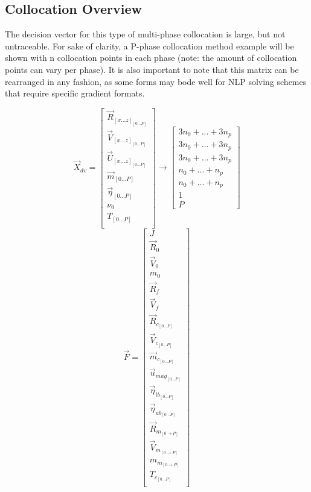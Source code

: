 \subsection{Collocation Overview}
The decision vector for this type of multi-phase collocation is large, but not untraceable. For sake of clarity, a P-phase collocation method example will be shown with n collocation points in each phase (note: the amount of collocation points can vary per phase). It is also important to note that this matrix can be rearranged in any fashion, as some forms may bode well for NLP solving schemes that require specific gradient formats.
\begin{multicols}{2}
\begin{equation}
\vec{X}_{dv} = 
\begin{bmatrix}
\vec{R}_{[x ... z]_{[0 ... P]}} \\
\vec{V}_{[x ... z]_{[0 ... P]}} \\
\vec{U}_{[x ... z]_{[0 ... P]}} \\
\vec{m}_{[0 ... P]} \\
\vec{\eta }_{[0 ... P]} \\
\nu_0 \\
T_{[0 ... P]} \\
\end{bmatrix}
\rightarrow
\begin{bmatrix}
3 n_0 + ... + 3 n_p \\
3 n_0 + ... + 3 n_p \\
3 n_0 + ... + 3 n_p \\
n_0 + ... + n_p \\
n_0 + ... + n_p \\
1 \\
P 
\end{bmatrix}
\end{equation} 
\break
\begin{equation}
\vec{F} = 
\begin{bmatrix}
J \\
\vec{R}_0 \\
\vec{V}_0 \\
m_0 \\
\vec{R}_f \\
\vec{V}_f \\
\vec{R}_{c_{[0 ... P]}} \\
\vec{V}_{c_{[0 ... P]}} \\
\vec{m}_{c_{[0 ... P]}} \\
\vec{u}_{mag_{[0 ... P]}} \\
\vec{\eta}_{lb_{[0 ... P]}} \\
\vec{\eta}_{ub_{[0 ... P]}} \\
\vec{R}_{m_{[0 \rightarrow P]}} \\
\vec{V}_{m_{[0 \rightarrow P]}} \\
m_{m_{[0 \rightarrow P]}} \\
T_{c_{[0 ... P]}} \\
\end{bmatrix}
\end{equation} 
\end{multicols}
